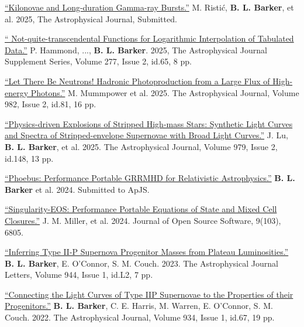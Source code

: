 \documentclass[11pt]{vitae}
\begin{document}
\begin{publist}

\item \href{https://ui.adsabs.harvard.edu/abs/2025arXiv250903003R/abstract}{``Kilonovae and Long-duration Gamma-ray Bursts.''} M. Risti\'c, \textbf{B. L. Barker}, et al. 2025, The Astrophysical Journal, Submitted.

\item \href{https://ui.adsabs.harvard.edu/abs/2025ApJS..277...65H/abstract}{`` Not-quite-transcendental Functions for Logarithmic Interpolation of Tabulated Data.''} P. Hammond, ..., \textbf{B. L. Barker}. 2025, The Astrophysical Journal Supplement Series, Volume 277, Issue 2, id.65, 8 pp.

\item \href{https://ui.adsabs.harvard.edu/abs/2025ApJ...982...81M/abstract}{``Let There Be Neutrons! Hadronic Photoproduction from a Large Flux of High-energy Photons.''} M. Mummpower et al. 2025. The Astrophysical Journal, Volume 982, Issue 2, id.81, 16 pp.

\item \href{https://ui.adsabs.harvard.edu/abs/2025ApJ...979..148L/abstract}{``Physics-driven Explosions of Stripped High-mass Stars: Synthetic Light Curves and Spectra of Stripped-envelope Supernovae with Broad Light Curves.''} J. Lu, \textbf{B. L. Barker}, et al. 2025. The Astrophysical Journal, Volume 979, Issue 2, id.148, 13 pp.

\item \href{https://ui.adsabs.harvard.edu/abs/2024arXiv241009146B/abstract}{``Phoebus: Performance Portable GRRMHD for Relativistic Astrophysics.''} \textbf{B. L. Barker} et al. 2024. Submitted to ApJS.

\item \href{https://joss.theoj.org/papers/10.21105/joss.06805}{``Singularity-EOS: Performance Portable Equations of State and Mixed Cell Closures.''} J. M. Miller, et al. 2024. Journal of Open Source Software, 9(103), 6805.

\item \href{https://doi.org/10.48550/arXiv.2211.05789}{``Inferring Type II-P Supernova Progenitor Masses from Plateau Luminosities.''} \textbf{B. L. Barker}, E. O'Connor, S. M. Couch. 2023. The Astrophysical Journal Letters, Volume 944, Issue 1, id.L2, 7 pp.

\item \href{https://doi.org/10.3847/1538-4357/ac77f3}{``Connecting the Light Curves of Type IIP Supernovae to the Properties of their Progenitors.''} \textbf{B. L. Barker}, C. E. Harris, M. Warren, E. O'Connor, S. M. Couch. 2022. The Astrophysical Journal, Volume 934, Issue 1, id.67, 19 pp.


\end{publist}
\end{document}
